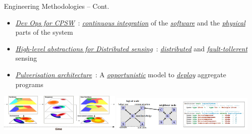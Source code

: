 \documentclass[presentation, 9pt, aspectratio=169]{beamer}\mode<presentation>{\usetheme{AMSBolognaFC}}
\begin{document}
\begin{frame}{Engineering Methodologies -- Cont.}
  \begin{itemize}
    \item \emph{\underline{Dev Ops for CPSW}}~\cite{casadei2022towards}: \emph{\underline{continuous integration}} of the \emph{\underline{software}} and the \emph{\underline{physical}} parts of the system
    \item \emph{\underline{High-level abstractions for Distributed sensing}}~\cite{aguzzi2022dynamic}: \emph{\underline{distributed}} and \emph{\underline{fault-tollerent}} sensing
    \item \emph{\underline{Pulverisation architecture}}~\cite{aguzzi2021towards}: A \emph{\underline{opportunistic}} model to \emph{\underline{deploy}} aggregate programs
  \end{itemize}
  \vspace{0.5cm}
  \includegraphics[width=0.45\textwidth]{img/action-with-multilayer.pdf}
  \includegraphics[width=0.53\textwidth]{img/screenshot.png}
  
\end{frame}
\end{document}
